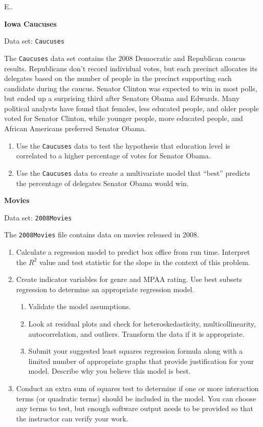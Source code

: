 \documentclass[
]{report}
\newcounter{excount}
\begin{document}
\begin{list}{E..}{ \setlength{\itemsep}{1.2em}}
  \item \textbf{Iowa Caucuses}

Data set: \texttt{Caucuses}

The \texttt{Caucuses} data set contains the $2008$ Democratic and Republican caucus results. Republicans don’t record individual votes, but each precinct allocates its delegates based on the number of people in the precinct supporting each candidate during the caucus. Senator Clinton was expected to win in most polls, but ended up a surprising third after Senators Obama and Edwards. Many political analysts have found that females, less educated people, and older people voted for Senator Clinton, while younger people, more educated people, and African Americans preferred Senator Obama.

    \begin{enumerate}
      \item Use the \texttt{Caucuses} data to test the hypothesis that education level is correlated to a higher percentage of votes for Senator Obama.
      \item Use the \texttt{Caucuses} data to create a multivariate model that “best” predicts the percentage of delegates Senator Obama would win.
    \end{enumerate}

  \item \textbf{Movies}

Data set: \texttt{2008Movies}

The \texttt{2008Movies} file contains data on movies released in 2008.

    \begin{enumerate}
      \item Calculate a regression model to predict box office from run time. Interpret the $R^2$ value and test statistic for the slope in the context of this problem.
      \item Create indicator variables for genre and MPAA rating. Use best subsets regression to determine an appropriate regression model.
        \begin{enumerate}
          \item Validate the model assumptions.
          \item Look at residual plots and check for heteroskedasticity, multicollinearity, autocorrelation, and outliers. Transform the data if it is appropriate.
          \item Submit your suggested least squares regression formula along with a limited number of appropriate graphs that provide justification for your model. Describe why you believe this model is best.
        \end{enumerate}
      \item Conduct an extra sum of squares test to determine if one or more interaction terms (or quadratic terms) should be included in the model. You can choose any terms to test, but enough software output needs to be provided so that the instructor can verify your work.
    \end{enumerate}

\end{list}
\end{document}
